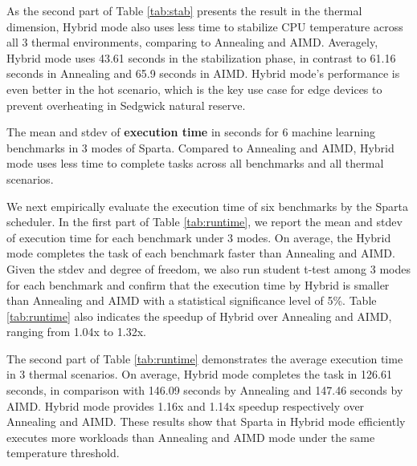 

As the second part of Table \ref{tab:stab} presents the result in the thermal dimension, Hybrid mode also uses less time to stabilize CPU temperature across all 3 thermal environments, comparing to Annealing and AIMD. Averagely, Hybrid mode uses 43.61 seconds in the stabilization phase, in contrast to 61.16 seconds in Annealing and 65.9 seconds in AIMD. Hybrid mode's performance is even better in the hot scenario, which is the key use case for edge devices to prevent overheating in Sedgwick natural reserve.

\begin{table}[t]
\caption{The mean and stdev of \textbf{execution time} in seconds for 6 machine learning benchmarks in 3 modes of Sparta. Compared to Annealing and AIMD, Hybrid mode uses less time to complete tasks across all benchmarks and all thermal scenarios. }\label{tab:runtime}
\vspace{1mm}
\centering
\resizebox{350pt}{!}{}
\newline
\vspace{3mm}
\newline
\resizebox{300pt}{!}{}
\end{table}


We next empirically evaluate the execution time of six benchmarks by the Sparta scheduler. In the first part of Table \ref{tab:runtime}, we report the mean and stdev of execution time for each benchmark under 3 modes. On average, the Hybrid mode completes the task of each benchmark faster than Annealing and AIMD. Given the stdev and degree of freedom, we also run student t-test among 3 modes for each benchmark and confirm that the execution time by Hybrid is smaller than Annealing and AIMD with a statistical significance level of 5\%. Table \ref{tab:runtime} also indicates the speedup of Hybrid over Annealing and AIMD, ranging from 1.04x to 1.32x. 

The second part of Table \ref{tab:runtime} demonstrates the average execution time in 3 thermal scenarios. On average, Hybrid mode completes the task in 126.61 seconds, in comparison with 146.09 seconds by Annealing and 147.46 seconds by AIMD. Hybrid mode provides 1.16x and 1.14x speedup respectively over Annealing and AIMD. These results show that Sparta in Hybrid mode efficiently executes more workloads than Annealing and AIMD mode under the same temperature threshold. 



